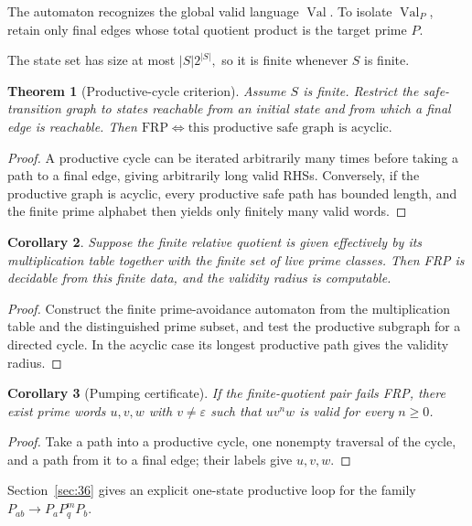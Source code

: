 \documentclass[11pt,a4paper]{article}
\newtheorem{theorem}{Theorem}[section]
\newtheorem{corollary}[theorem]{Corollary}
\newcommand{\eps}{\varepsilon}
\newcommand{\Val}{\operatorname{Val}}
\begin{document}
The automaton recognizes the global valid language $\Val$.  To isolate $\Val_P$, retain only final edges whose total quotient product is the target prime $P$.

The state set has size at most
\(|S|2^{|S|},\)
so it is finite whenever $S$ is finite.

\begin{theorem}[Productive-cycle criterion]
Assume $S$ is finite.  Restrict the safe-transition graph to states reachable from an initial state and from which a final edge is reachable.  Then
\(\mathrm{FRP} \iff \text{this productive safe graph is acyclic}.\)
\end{theorem}

\begin{proof}
A productive cycle can be iterated arbitrarily many times before taking a path to a final edge, giving arbitrarily long valid RHSs.  Conversely, if the productive graph is acyclic, every productive safe path has bounded length, and the finite prime alphabet then yields only finitely many valid words.
\end{proof}

\begin{corollary}
Suppose the finite relative quotient is given effectively by its multiplication table together with the finite set of live prime classes.  Then FRP is decidable from this finite data, and the validity radius is computable.
\end{corollary}

\begin{proof}
Construct the finite prime-avoidance automaton from the multiplication table and the distinguished prime subset, and test the productive subgraph for a directed cycle.  In the acyclic case its longest productive path gives the validity radius.
\end{proof}

\begin{corollary}[Pumping certificate]
\label{cor:pumping-certificate}
If the finite-quotient pair fails FRP, there exist prime words $u,v,w$ with $v\neq\eps$ such that $uv^n w$ is valid for every $n\ge0$.
\end{corollary}

\begin{proof}
Take a path into a productive cycle, one nonempty traversal of the cycle, and a path from it to a final edge; their labels give $u,v,w$.
\end{proof}

Section~\ref{sec:36} gives an explicit one-state productive loop for the family $P_{ab}\to P_aP_q^mP_b$.
\end{document}
